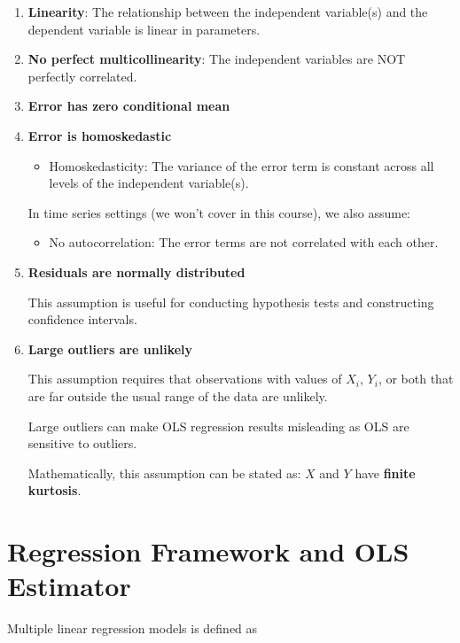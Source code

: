 \documentclass[
  12pt,
  letterpaper,
]{scrbook}
\providecommand{\tightlist}{%
  \setlength{\itemsep}{0pt}\setlength{\parskip}{0pt}}
\renewcommand{\tightlist}{\setlength{\itemsep}{0.5\baselineskip}\setlength{\parskip}{0.2\baselineskip}}
\theoremstyle{plain}
\theoremstyle{definition}
\theoremstyle{remark}
\begin{document}
\begin{enumerate}
\def\labelenumi{\arabic{enumi}.}
\item
  \textbf{Linearity}: The relationship between the independent
  variable(s) and the dependent variable is linear in parameters.
\item
  \textbf{No perfect multicollinearity}: The independent variables are
  NOT {perfectly correlated.}
\item
  \textbf{Error has zero conditional mean}
\item
  \textbf{Error is homoskedastic}

  \begin{itemize}
  \tightlist
  \item
    Homoskedasticity: The variance of the error term is constant across
    all levels of the independent variable(s).
  \end{itemize}

  {In time series settings (we won't cover in this course), we also
  assume:}

  \begin{itemize}
  \tightlist
  \item
    {No autocorrelation: The error terms are not correlated with each
    other.}
  \end{itemize}
\item
  \textbf{Residuals are normally distributed}

  This assumption is useful for conducting hypothesis tests and
  constructing confidence intervals.
\item
  \textbf{Large outliers are unlikely}

  This assumption requires that observations with values of \(X_i\),
  \(Y_i\), or both that are far outside the usual range of the data are
  unlikely.

  Large outliers can make OLS regression results misleading as OLS are
  sensitive to outliers.

  Mathematically, this assumption can be stated as: \(X\) and \(Y\) have
  \textbf{finite kurtosis}.
\end{enumerate}

\section{Regression Framework and OLS
Estimator}\label{regression-framework-and-ols-estimator}

Multiple linear regression models is defined as
\end{document}
